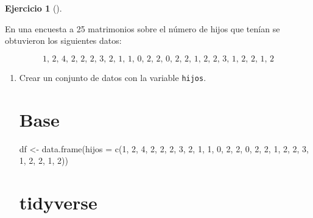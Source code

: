 \documentclass[
  spanish,
  a4paper,
]{scrreport}
\newenvironment{Shaded}{\begin{snugshade}}{\end{snugshade}}
\newcommand{\AttributeTok}[1]{\textcolor[rgb]{0.40,0.45,0.13}{#1}}
\newcommand{\DecValTok}[1]{\textcolor[rgb]{0.68,0.00,0.00}{#1}}
\newcommand{\FunctionTok}[1]{\textcolor[rgb]{0.28,0.35,0.67}{#1}}
\newcommand{\NormalTok}[1]{\textcolor[rgb]{0.00,0.23,0.31}{#1}}
\newcommand{\OtherTok}[1]{\textcolor[rgb]{0.00,0.23,0.31}{#1}}
\theoremstyle{definition}
\newtheorem{exercise}{Ejercicio}[chapter]
\theoremstyle{remark}
\begin{document}
\begin{exercise}[]\protect\hypertarget{exr-frecuencias-graficos-hijos}{}\label{exr-frecuencias-graficos-hijos}

En una encuesta a 25 matrimonios sobre el número de hijos que tenían se
obtuvieron los siguientes datos:

\[
\mbox{1, 2, 4, 2, 2, 2, 3, 2, 1, 1, 0, 2, 2, 0, 2, 2, 1, 2, 2, 3, 1, 2, 2, 1, 2}
\]

\begin{enumerate}
\def\labelenumi{\alph{enumi}.}
\item
  Crear un conjunto de datos con la variable \texttt{hijos}.

  \begin{tcolorbox}[enhanced jigsaw, titlerule=0mm, arc=.35mm, rightrule=.15mm, opacitybacktitle=0.6, leftrule=.75mm, colframe=quarto-callout-tip-color-frame, toptitle=1mm, breakable, colbacktitle=quarto-callout-tip-color!10!white, bottomrule=.15mm, colback=white, left=2mm, bottomtitle=1mm, opacityback=0, title=\textcolor{quarto-callout-tip-color}{\faLightbulb}\hspace{0.5em}{Solución}, toprule=.15mm, coltitle=black]

  \section{Base}

\begin{Shaded}
\begin{Highlighting}[]
\NormalTok{df }\OtherTok{\textless{}{-}} \FunctionTok{data.frame}\NormalTok{(}\AttributeTok{hijos =} \FunctionTok{c}\NormalTok{(}\DecValTok{1}\NormalTok{, }\DecValTok{2}\NormalTok{, }\DecValTok{4}\NormalTok{, }\DecValTok{2}\NormalTok{, }\DecValTok{2}\NormalTok{, }\DecValTok{2}\NormalTok{, }\DecValTok{3}\NormalTok{, }\DecValTok{2}\NormalTok{, }\DecValTok{1}\NormalTok{, }\DecValTok{1}\NormalTok{, }\DecValTok{0}\NormalTok{, }\DecValTok{2}\NormalTok{, }\DecValTok{2}\NormalTok{, }\DecValTok{0}\NormalTok{, }\DecValTok{2}\NormalTok{, }\DecValTok{2}\NormalTok{, }\DecValTok{1}\NormalTok{, }\DecValTok{2}\NormalTok{, }\DecValTok{2}\NormalTok{, }\DecValTok{3}\NormalTok{, }\DecValTok{1}\NormalTok{, }\DecValTok{2}\NormalTok{, }\DecValTok{2}\NormalTok{, }\DecValTok{1}\NormalTok{, }\DecValTok{2}\NormalTok{))}
\end{Highlighting}
\end{Shaded}

  \section{tidyverse}


\end{tcolorbox}
\end{enumerate}
\end{exercise}
\end{document}
